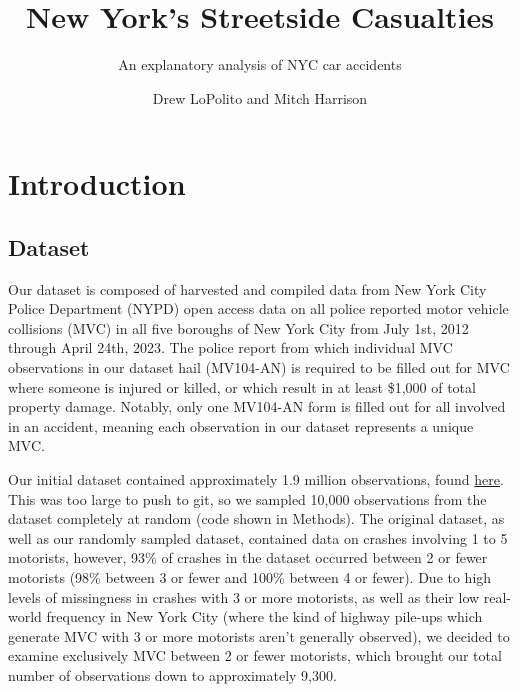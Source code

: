 \documentclass[
  letterpaper,
  DIV=11,
  numbers=noendperiod]{scrartcl}
\title{New York's Streetside Casualties}
\subtitle{An explanatory analysis of NYC car accidents}
\author{Drew LoPolito and Mitch Harrison}
\date{}
\begin{document}
\maketitle
\ifdefined\Shaded\renewenvironment{Shaded}{\begin{tcolorbox}[enhanced, borderline west={3pt}{0pt}{shadecolor}, interior hidden, breakable, sharp corners, frame hidden, boxrule=0pt]}{\end{tcolorbox}}\fi

\hypertarget{introduction}{%
\section{Introduction}\label{introduction}}

\hypertarget{dataset}{%
\subsection{Dataset}\label{dataset}}

Our dataset is composed of harvested and compiled data from New York
City Police Department (NYPD) open access data on all police reported
motor vehicle collisions (MVC) in all five boroughs of New York City
from July 1st, 2012 through April 24th, 2023. The police report from
which individual MVC observations in our dataset hail (MV104-AN) is
required to be filled out for MVC where someone is injured or killed, or
which result in at least \$1,000 of total property damage. Notably, only
one MV104-AN form is filled out for all involved in an accident, meaning
each observation in our dataset represents a unique MVC.

Our initial dataset contained approximately 1.9 million observations,
found
\href{https://www.kaggle.com/datasets/utkarshx27/motor-vehicle-collisions?resource=download}{here}.
This was too large to push to git, so we sampled 10,000 observations
from the dataset completely at random (code shown in Methods). The
original dataset, as well as our randomly sampled dataset, contained
data on crashes involving 1 to 5 motorists, however, 93\% of crashes in
the dataset occurred between 2 or fewer motorists (98\% between 3 or
fewer and 100\% between 4 or fewer). Due to high levels of missingness
in crashes with 3 or more motorists, as well as their low real-world
frequency in New York City (where the kind of highway pile-ups which
generate MVC with 3 or more motorists aren't generally observed), we
decided to examine exclusively MVC between 2 or fewer motorists, which
brought our total number of observations down to approximately 9,300.
\end{document}
